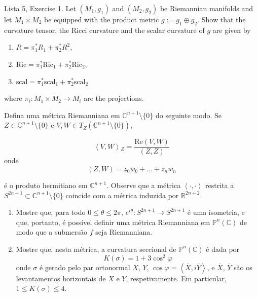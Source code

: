 \documentclass{book}
\begin{document}
\begin{exercise}
\label{lemma-curvatures-of-product-metric}
Lista 5, Exercise 1. Let $(M_1,g_1)$ and
$(M_2,g_2)$ be Riemannian manifolds and
let $M_1\times M_2$ be equipped with the
product metric $g:=g_1\oplus g_2$. Show
that the curvature tensor, the Ricci
curvature and the scalar curvature of $g$
are given by
\begin{enumerate}
\item $R=\pi_1^*R_1+\pi_2^*R^2$,
\item
$\text{Ric}=\pi_1^*\text{Ric}_1+
\pi_2^*\text{Ric}_2$,
\item
$\text{scal}=\pi_1^*\text{scal}_1+
\pi_2^*\text{scal}_2$
\end{enumerate}
where $\pi_i:M_1\times M_2\to M_i$ are the
projections.
\end{exercise}

\begin{example}
\label{example-curvature-of-CPn}
Defina uma métrica Riemanniana  em
$\mathbb{C}^{n+1}\setminus\{0\}$ do
seguinte modo. Se $Z \in
\mathbb{C}^{n+1}\setminus\{0\}$ e $V,W \in
T_Z
(\mathbb{C}^{n+1}\setminus\{0\})$,

$$
\left\langle{}V,W\right\rangle{}_Z=\frac{\text{Re}(V,W)}{(Z,
Z)}
$$
onde
$$
(Z,W)=z_0\overline{w}_0+\ldots+
z_n\overline{w}_n
$$

é o produto hermitiano em $\mathbb{C}^{n+1}$.
Observe que a métrica
$\left\langle{}\cdot,\cdot\right\rangle{}$ restrita a
$S^{2n+1}\subset
\mathbb{C}^{n+1}\setminus\{0\}$ coincide com
a métrica induzida por
$\mathbb{R}^{2n+2}$.
\begin{enumerate}

\item Mostre que, para todo $0\leq \theta
\leq 2\pi$, $e^{i\theta}:S^{2n+1}\to
S^{2n+1}$ é uma isometria, e que, portanto, é
possível definir uma métrica
Riemanniana em $\mathbb{P}^n(\mathbb{C})$ de
modo que a submersão $f$ seja
Riemanniana.

\item Mostre que, nesta métrica, a curvatura
seccional de
$\mathbb{P}^n(\mathbb{C})$ é dada por
$$
K(\sigma)=1+3\cos^2\varphi
$$
onde $\sigma$ é gerado pelo par ortonormal
$X$, $Y$, $\cos
\varphi=\left\langle{}\overline{X},i\overline{Y}
\right\rangle{}$,
e $\overline{X}$,
$\overline{Y}$ são os levantamentos
horizontais de $X$ e $Y$, respetivamente. Em
particular, $1 \leq  K(\sigma) \leq  4$.
\end{enumerate}
\end{example}
\end{document}
